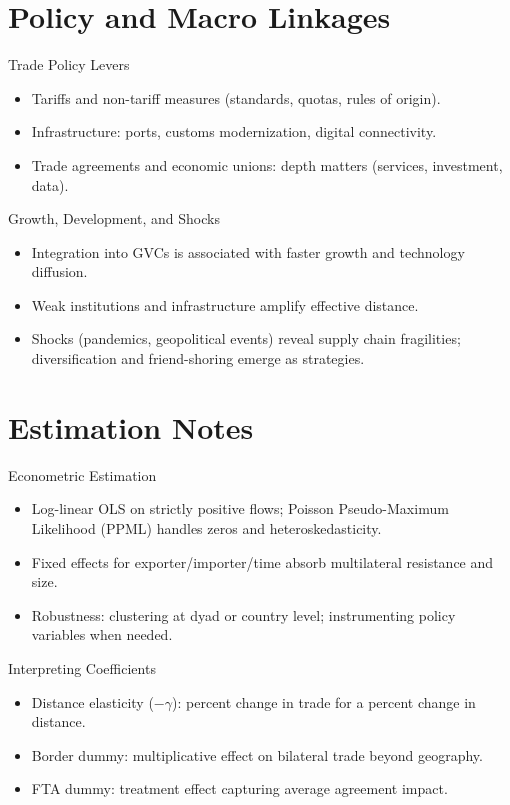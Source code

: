 \documentclass{beamer}
\begin{document}
\section{Policy and Macro Linkages}
\begin{frame}{Trade Policy Levers}
\begin{itemize}
  \item Tariffs and non-tariff measures (standards, quotas, rules of origin).
  \item Infrastructure: ports, customs modernization, digital connectivity.
  \item Trade agreements and economic unions: depth matters (services, investment, data).
\end{itemize}
\end{frame}

\begin{frame}{Growth, Development, and Shocks}
\begin{itemize}
  \item Integration into GVCs is associated with faster growth and technology diffusion.
  \item Weak institutions and infrastructure amplify effective distance.
  \item Shocks (pandemics, geopolitical events) reveal supply chain fragilities; diversification and friend-shoring emerge as strategies.
\end{itemize}
\end{frame}

\section{Estimation Notes}
\begin{frame}{Econometric Estimation}
\begin{itemize}
  \item Log-linear OLS on strictly positive flows; Poisson Pseudo-Maximum Likelihood (PPML) handles zeros and heteroskedasticity.
  \item Fixed effects for exporter/importer/time absorb multilateral resistance and size.
  \item Robustness: clustering at dyad or country level; instrumenting policy variables when needed.
\end{itemize}
\end{frame}

\begin{frame}{Interpreting Coefficients}
\begin{itemize}
  \item Distance elasticity ($-\gamma$): percent change in trade for a percent change in distance.
  \item Border dummy: multiplicative effect on bilateral trade beyond geography.
  \item FTA dummy: treatment effect capturing average agreement impact.
\end{itemize}
\end{frame}
\end{document}
